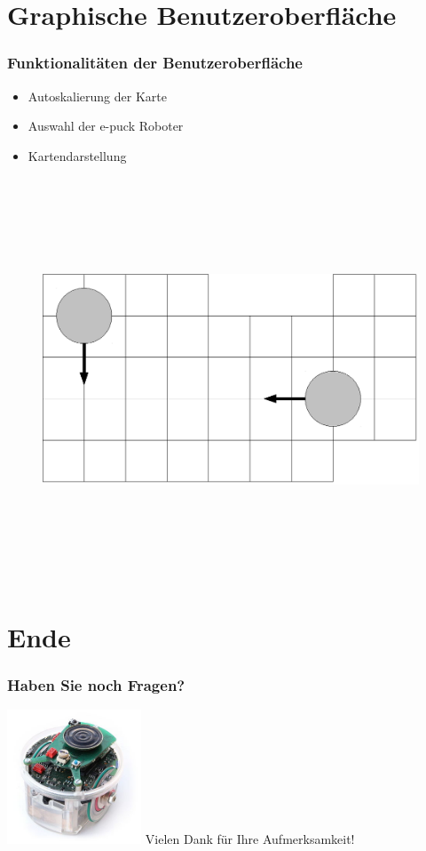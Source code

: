 \documentclass{beamer}
\begin{document}
\section{Graphische Benutzeroberfläche}
\begin{frame}
  \frametitle{Funktionalitäten der Benutzeroberfläche}
  	\begin{itemize}
		\item Autoskalierung der Karte
		\item Auswahl der e-puck Roboter
		\item Kartendarstellung
	\end{itemize}  
	\vspace{1cm}
	\begin{figure}[bp]
		\includegraphics[height=12cm]{karte.eps} 
	\end{figure}
\end{frame}

\section{Ende}
\begin{frame}
	\frametitle{Haben Sie noch Fragen?}
		\includegraphics[height=4cm]{ende.jpg}
		\vspace{1cm}
	Vielen Dank für Ihre Aufmerksamkeit!
\end{frame}
\end{document}
